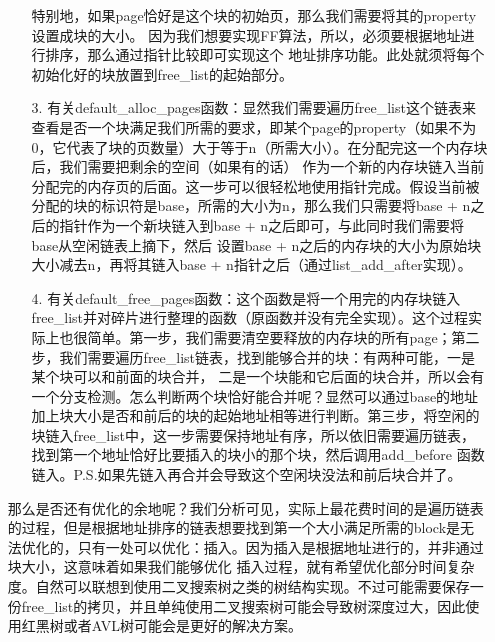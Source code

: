\documentclass[UTF8, a4paper]{ctexart}
\begin{document}
\begin{enumerate}
\begin{enumerate}
                   特别地，如果page恰好是这个块的初始页，那么我们需要将其的property设置成块的大小。 因为我们想要实现FF算法，所以，必须要根据地址进行排序，那么通过指针比较即可实现这个
                   地址排序功能。此处就须将每个初始化好的块放置到free\_list的起始部分。
        \item [3.] 有关default\_alloc\_pages函数：显然我们需要遍历free\_list这个链表来查看是否一个块满足我们所需的要求，即某个page的property（如果不为0，它代表了块的页数量）大于等于n（所需大小）。在分配完这一个内存块后，我们需要把剩余的空间（如果有的话）
                   作为一个新的内存块链入当前分配完的内存页的后面。这一步可以很轻松地使用指针完成。假设当前被分配的块的标识符是base，所需的大小为n，那么我们只需要将base + n之后的指针作为一个新块链入到base + n之后即可，与此同时我们需要将base从空闲链表上摘下，然后
                   设置base + n之后的内存块的大小为原始块大小减去n，再将其链入base + n指针之后（通过list\_add\_after实现）。
        \item [4.] 有关default\_free\_pages函数：这个函数是将一个用完的内存块链入free\_list并对碎片进行整理的函数（原函数并没有完全实现）。这个过程实际上也很简单。第一步，我们需要清空要释放的内存块的所有page；第二步，我们需要遍历free\_list链表，找到能够合并的块：有两种可能，一是某个块可以和前面的块合并，
                   二是一个块能和它后面的块合并，所以会有一个分支检测。怎么判断两个块恰好能合并呢？显然可以通过base的地址加上块大小是否和前后的块的起始地址相等进行判断。第三步，将空闲的块链入free\_list中，这一步需要保持地址有序，所以依旧需要遍历链表，找到第一个地址恰好比要插入的块小的那个块，然后调用add\_before
                   函数链入。P.S.如果先链入再合并会导致这个空闲块没法和前后块合并了。
    \end{enumerate}
    那么是否还有优化的余地呢？我们分析可见，实际上最花费时间的是遍历链表的过程，但是根据地址排序的链表想要找到第一个大小满足所需的block是无法优化的，只有一处可以优化：插入。因为插入是根据地址进行的，并非通过块大小，这意味着如果我们能够优化
    插入过程，就有希望优化部分时间复杂度。自然可以联想到使用二叉搜索树之类的树结构实现。不过可能需要保存一份free\_list的拷贝，并且单纯使用二叉搜索树可能会导致树深度过大，因此使用红黑树或者AVL树可能会是更好的解决方案。
\end{enumerate}
\end{document}
